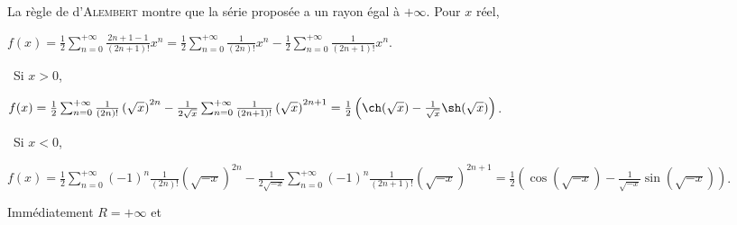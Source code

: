 {{\begin{center}
\fbox{
$\forall x\in]-1,1[$, $\sum_{n=0}^{+\infty}\frac{x^n}{2n+1}=\left\{
\begin{array}{l}
\frac{\Argth(\sqrt{x})}{\sqrt{x}}\;\text{si}\;x\in]0,1[\\
\rule[-2mm]{0mm}{4mm}1\;\text{si}\;x=0\\
\frac{\Arctan(\sqrt{-x})}{\sqrt{-x}}\;\text{si}\;x\in]-1,0[
\end{array}
\right.$.
}
\end{center}
La règle de d'\textsc{Alembert} montre que la série proposée a un rayon égal à $+\infty$. Pour $x$ réel, 

\begin{center}
$f(x) =\frac{1}{2}\sum_{n=0}^{+\infty}\frac{2n+1-1}{(2n+1)!}x^n=\frac{1}{2}\sum_{n=0}^{+\infty}\frac{1}{(2n)!}x^n-\frac{1}{2}\sum_{n=0}^{+\infty}\frac{1}{(2n+1)!}x^n$.
\end{center}

\textbullet~Si $x > 0$,  

\begin{center}
$f(x) =\frac{1}{2}\sum_{n=0}^{+\infty}\frac{1}{(2n)!}\left(\sqrt{x}\right)^{2n}-\frac{1}{2\sqrt{x}}\sum_{n=0}^{+\infty}\frac{1}{(2n+1)!}\left(\sqrt{x}\right)^{2n+1}=\frac{1}{2}\left(\ch(\sqrt{x})-\frac{1}{\sqrt{x}}\sh(\sqrt{x})\right)$.
\end{center}

\textbullet~Si $x<0$,  

\begin{center}
$f(x) =\frac{1}{2}\sum_{n=0}^{+\infty}(-1)^n\frac{1}{(2n)!}\left(\sqrt{-x}\right)^{2n}-\frac{1}{2\sqrt{-x}}\sum_{n=0}^{+\infty}(-1)^n\frac{1}{(2n+1)!}\left(\sqrt{-x}\right)^{2n+1}=\frac{1}{2}\left(\cos(\sqrt{-x})-\frac{1}{\sqrt{-x}}\sin(\sqrt{-x})\right)$.
\end{center}

\begin{center}
\end{center}
Immédiatement $R = +\infty$ et 

}}

